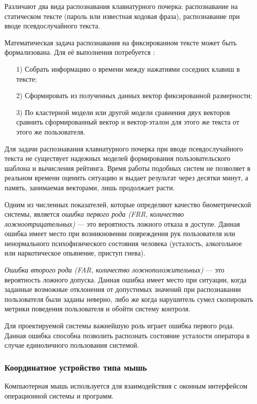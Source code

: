 Различают два вида распознавания клавиатурного почерка: распознавание на статическом тексте (пароль или известная кодовая фраза), распознавание при вводе псевдослучайного текста. \cite{keystroke}

Математическая задача распознавания на фиксированном тексте может быть формализована. Для её выполнения потребуется \cite{keystroke}:
\begin{itemize}
\item[1)] Собрать информацию о времени между нажатиями соседних клавиш в тексте;
\item[2)] Сформировать из полученных данных вектор фиксированной размерности;
\item[3)] По кластерной модели или другой модели сравнения двух векторов сравнить сформированный вектор и вектор-эталон для этого же текста от этого же пользователя.
\end{itemize}

Для задачи распознавания клавиатурного почерка при вводе псевдослучайного текста не существует надежных моделей формирования пользовательского шаблона и вычисления рейтинга. Время работы подобных систем не позволяет в реальном времени оценить ситуацию и выдает результат через десятки минут, а память, занимаемая векторами, лишь продолжает расти. \cite{keystroke}

Одним из численных показателей, которые определяют качество биометрической системы, является \textit{ошибка первого рода (FRR, количество ложноотрицательных)} --- это вероятность ложного отказа в доступе. Данная ошибка имеет место при возникновении повреждения рук пользователя или ненормального психофизического состояния человека (усталость, алкогольное или наркотическое опьянение, приступ гнева).\cite{keystroke}

\textit{Ошибка второго рода (FAR, количество ложноположительных)} --- это вероятность ложного допуска. Данная ошибка имеет место при ситуации, когда заданные возможные отклонения от допустимых значений при распознавании пользователя были заданы неверно, либо же когда нарушитель сумел скопировать метрики поведения пользователя и обойти систему контроля. \cite{keystroke}

Для проектируемой системы важнейшую роль играет ошибка первого рода. Данная ошибка способна позволить распознать состояние усталости оператора в случае единоличного пользования системой.

\subsubsection{Координатное устройство типа мышь}
Компьютерная мышь используется для взаимодействия с оконным интерфейсом операционной системы и программ.

